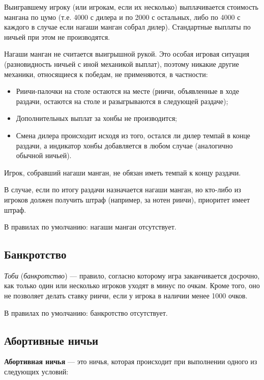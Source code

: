 Выигравшему игроку (или игрокам, если их несколько) выплачивается стоимость мангана по цумо (т.е. 4000 с дилера и по 2000 с остальных, либо по 4000 с каждого в случае если нагаши манган собрал дилер). Стандартные выплаты по ничьей при этом не производятся.

Нагаши манган не считается выигрышной рукой. Это особая игровая ситуация (разновидность ничьей с иной механикой выплат), поэтому никакие другие механики, относящиеся к победам, не применяются, в частности:

\begin{itemize}
	\item Риичи-палочки на столе остаются на месте (риичи, объявленные в ходе раздачи, остаются на столе и разыгрываются в следующей раздаче);
	\item Дополнительных выплат за хонбы не производится;
	\item Смена дилера происходит исходя из того, остался ли дилер темпай в конце раздачи, а индикатор хонбы добавляется в любом случае (аналогично обычной ничьей).
\end{itemize}

Игрок, собравший нагаши манган, не обязан иметь темпай к концу раздачи.

В случае, если по итогу раздачи назначается нагаши манган, но кто-либо из игроков должен получить штраф (например, за нотен риичи), приоритет имеет штраф.

В правилах по умолчанию: нагаши манган отсутствует.

\subsection{Банкротство}

\textit{Тоби} (\textit{банкротство}) --- правило, согласно которому игра заканчивается досрочно, как только один или несколько игроков уходят в минус по очкам. Кроме того, оно не позволяет делать ставку риичи, если у игрока в наличии менее 1000 очков.

В правилах по умолчанию: банкротство отсутствует.

\subsection{Абортивные ничьи}

\textbf{Абортивная ничья} --- это ничья, которая происходит при выполнении одного из следующих условий:

